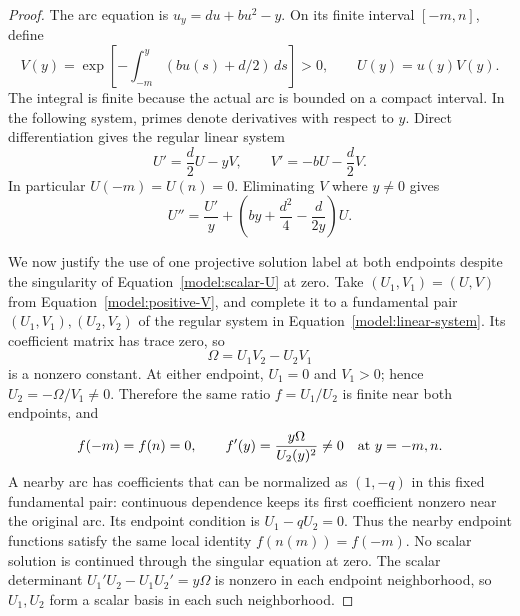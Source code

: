 \begin{proof}
The arc equation is \(u_y=du+bu^2-y\).  On its finite interval
\([-m,n]\), define
\begin{equation}
 V(y)=\exp\left[-\int_{-m}^{y}(bu(s)+d/2)\,ds\right]>0,
 \qquad U(y)=u(y)V(y).
 \label{model:positive-V}
\end{equation}
The integral is finite because the actual arc is bounded on a compact
interval. In the following system, primes denote derivatives with
respect to \(y\). Direct differentiation gives the regular linear system
\begin{equation}
 U'=\frac d2U-yV,\qquad V'=-bU-\frac d2V.
 \label{model:linear-system}
\end{equation}
In particular \(U(-m)=U(n)=0\).
Eliminating \(V\) where \(y\ne0\) gives
\begin{equation}
 U''=\frac{U'}{y}
       +\left(by+\frac{d^2}{4}-\frac{d}{2y}\right)U.
 \label{model:scalar-U}
\end{equation}

We now justify the use of one projective solution label at both
endpoints despite the singularity of Equation~\eqref{model:scalar-U}
at zero.  Take \((U_1,V_1)=(U,V)\) from
Equation~\eqref{model:positive-V}, and complete it to a fundamental
pair \((U_1,V_1),(U_2,V_2)\) of the regular system in
Equation~\eqref{model:linear-system}.  Its coefficient matrix has trace zero, so
\[
 \Omega=U_1V_2-U_2V_1
\]
is a nonzero constant.  At either endpoint, \(U_1=0\) and \(V_1>0\);
hence \(U_2=-\Omega/V_1\ne0\).  Therefore the same ratio
\(f=U_1/U_2\) is finite near both endpoints, and
\begin{equation}
 f(-m)=f(n)=0,\qquad f'(y)=\frac{y\Omega}{U_2(y)^2}\ne0
 \quad\hbox{at }y=-m,n.
 \label{model:common-label}
\end{equation}
A nearby arc has coefficients that can be normalized as \((1,-q)\)
in this fixed fundamental pair: continuous dependence keeps its first
coefficient nonzero near the original arc.  Its endpoint condition is
\(U_1-qU_2=0\).  Thus the nearby endpoint functions satisfy the same
local identity \(f(n(m))=f(-m)\).  No scalar solution is continued
through the singular equation at zero.  The scalar determinant
\(U_1'U_2-U_1U_2'=y\Omega\) is nonzero in each endpoint neighborhood, so \(U_1,U_2\) form
a scalar basis in each such neighborhood.


\end{proof}
